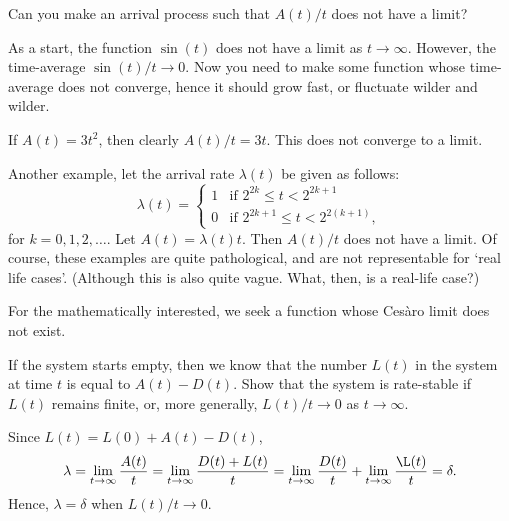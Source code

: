 \begin{exercise}
  Can you make an arrival process such that $A(t)/t$ does not have a limit?
\begin{hint}
  As a start, the function $\sin(t)$ does not have a limit as $t\to\infty$.
  However, the time-average $\sin(t)/t \to 0$.
  Now you need to make some function whose time-average does not converge, hence it should grow fast, or fluctuate wilder and wilder.
\end{hint}
\begin{solution}
 If $A(t) = 3 t^2$, then clearly $A(t)/t = 3t$. This does not
 converge to a limit. 

 Another example, let the arrival rate $\lambda(t)$ be given as follows:
 \begin{equation*}
 \lambda(t) = 
 \begin{cases}
 1 & \text{if } 2^{2k} \leq t < 2^{2k+1} \\
 0 & \text{if } 2^{2k+1} \leq t < 2^{2(k+1)},
 \end{cases}
 \end{equation*}
 for $k=0,1,2,\ldots$.
 Let $A(t) = \lambda(t) t$.
 Then $A(t)/t$ does not have a limit.
 Of course, these examples are quite pathological, and are not representable for `real life cases'.
 (Although this is also quite vague.
 What, then, is a real-life case?)

 For the mathematically interested, we seek a function whose Ces\`aro limit does not exist.
\end{solution}
\end{exercise}


\begin{exercise}\label{ex:98}
If the system starts empty, then we know that the number $L(t)$ in the system at time $t$ is equal to $A(t) - D(t)$.
Show that the system is rate-stable  if $L(t)$ remains finite, or, more generally, $L(t)/t \to 0$ as $t\to\infty$.
\begin{solution}
Since $L(t) = L(0) + A(t) - D(t)$, 
\begin{equation*}
 \lambda = \lim_{t \to \infty} \frac{A(t)}t = \lim_{t \to \infty} \frac{D(t)+L(t)}t = \lim_{t \to \infty} \frac{D(t)}t + \lim_{t \to \infty} \frac{\L(t)}t 
 = \delta. 
\end{equation*}
Hence, $\lambda=\delta$ when $L(t)/t\to0$.
\end{solution}
\end{exercise}




